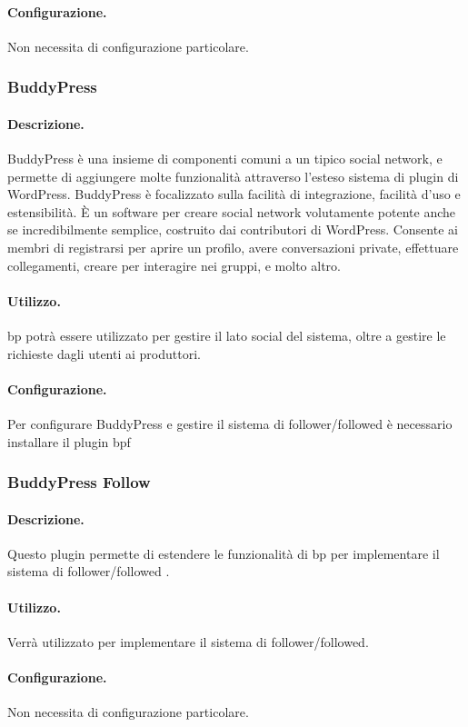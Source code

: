 \paragraph{Configurazione.} Non necessita di configurazione particolare.

\subsubsection{BuddyPress}
\paragraph{Descrizione.}
BuddyPress è una insieme di componenti comuni a un tipico social network, e permette di aggiungere molte funzionalità attraverso l'esteso sistema di plugin di WordPress.
BuddyPress è focalizzato sulla facilità di integrazione, facilità d'uso e estensibilità. È un software per creare social network volutamente potente anche se incredibilmente semplice, costruito dai contributori di WordPress.
Consente ai membri di registrarsi per aprire un profilo, avere conversazioni private, effettuare collegamenti, creare per interagire nei gruppi, e molto altro. 
\paragraph{Utilizzo.}
\gls{bp} potrà essere utilizzato per gestire il lato social del sistema, oltre a gestire le richieste dagli utenti ai produttori.
\paragraph{Configurazione.}
Per configurare BuddyPress e gestire il sistema di follower/followed è necessario installare il plugin \gls{bpf}

\subsubsection{BuddyPress Follow}
\paragraph{Descrizione.}
Questo plugin permette di estendere le funzionalità di \gls{bp} per implementare il sistema di follower/followed .
\paragraph{Utilizzo.} Verrà utilizzato per implementare il sistema di follower/followed.
\paragraph{Configurazione.} Non necessita di configurazione particolare.

